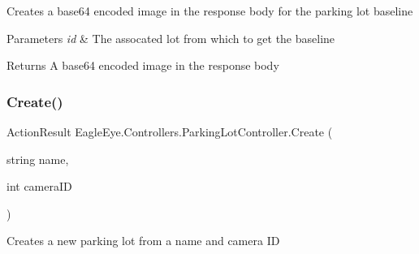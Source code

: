 Creates a base64 encoded image in the response body for the parking lot baseline 


\begin{DoxyParams}{Parameters}
{\em id} & The assocated lot from which to get the baseline\\
\hline
\end{DoxyParams}
\begin{DoxyReturn}{Returns}
A base64 encoded image in the response body
\end{DoxyReturn}
\mbox{\label{class_eagle_eye_1_1_controllers_1_1_parking_lot_controller_a5af6a4b208418bca8a26f30255c62926}} 
\subsubsection{\texorpdfstring{Create()}{Create()}}
{\footnotesize\ttfamily Action\+Result Eagle\+Eye.\+Controllers.\+Parking\+Lot\+Controller.\+Create (\begin{DoxyParamCaption}\item[{string}]{name,  }\item[{int}]{camera\+ID }\end{DoxyParamCaption})}



Creates a new parking lot from a name and camera ID 


